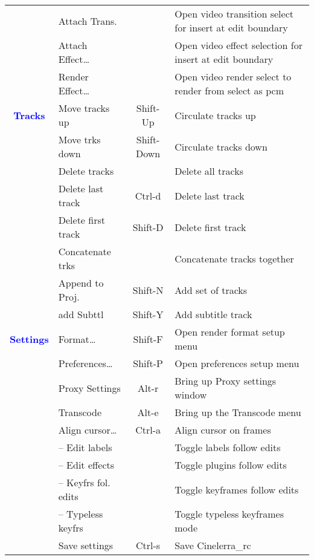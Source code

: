 \begin{center}
\begin{longtable}{>{\bfseries}c l c p{6cm}}
             & Attach Trans. &  & Open video transition select for insert at edit boundary \\             
             & Attach Effect\dots &  & Open video effect selection for insert at edit boundary \\             
             & Render Effect\dots &  & Open video render select to render from select as pcm \\
             \midrule
          \textcolor{blue}{Tracks} & Move tracks up & Shift-Up & Circulate tracks up \\             
             & Move trks down & Shift-Down & Circulate tracks down \\             
             & Delete tracks &  & Delete all tracks \\             
             & Delete last track & Ctrl-d & Delete last track \\             
             & Delete first track & Shift-D & Delete first track \\             
             & Concatenate trks &  & Concatenate tracks together \\             
             & Append to Proj.	 & Shift-N & Add set of tracks \\             
             & add Subttl & Shift-Y & Add subtitle track \\             
             \midrule
          \textcolor{blue}{Settings} & Format\dots & Shift-F & Open render format setup menu \\             
             & Preferences\dots & Shift-P & Open preferences setup menu \\             
             & Proxy Settings & Alt-r & Bring up Proxy settings window \\             
             & Transcode & Alt-e & Bring up the Transcode menu \\             
             & Align cursor\dots & Ctrl-a & Align cursor on frames \\             
             & -- Edit labels &  & Toggle labels follow edits \\             
             & -- Edit effects &  & Toggle plugins follow edits \\             
             & -- Keyfrs fol. edits &  & Toggle keyframes follow edits \\             
             & -- Typeless keyfrs &  & Toggle typeless keyframes mode \\             
             & Save settings & Ctrl-s & Save Cinelerra\_rc \\             

\end{longtable}
\end{center}
